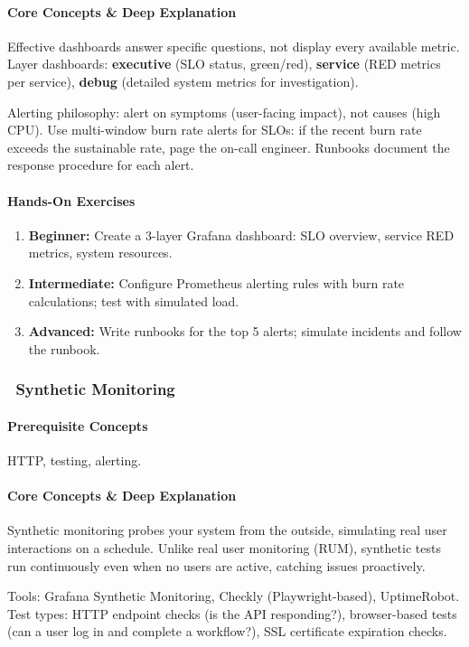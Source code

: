 \documentclass[11pt, a4paper, oneside]{report}
\newcommand{\awareness}[1]{\subsubsection{\texorpdfstring{\fcolorbox{gray!50}{gray!10}{\footnotesize\bfseries\color{gray!50!black} AWARENESS}~#1}{#1}}}
\begin{document}
\paragraph{Core Concepts \& Deep Explanation} Effective dashboards answer specific questions, not display every available metric. Layer dashboards: \textbf{executive} (SLO status, green/red), \textbf{service} (RED metrics per service), \textbf{debug} (detailed system metrics for investigation).

Alerting philosophy: alert on symptoms (user-facing impact), not causes (high CPU). Use multi-window burn rate alerts for SLOs: if the recent burn rate exceeds the sustainable rate, page the on-call engineer. Runbooks document the response procedure for each alert.

\paragraph{Hands-On Exercises}
\begin{enumerate}[leftmargin=*]
\item \textbf{Beginner:} Create a 3-layer Grafana dashboard: SLO overview, service RED metrics, system resources.
\item \textbf{Intermediate:} Configure Prometheus alerting rules with burn rate calculations; test with simulated load.
\item \textbf{Advanced:} Write runbooks for the top 5 alerts; simulate incidents and follow the runbook.
\end{enumerate}

\awareness{Synthetic Monitoring}

\paragraph{Prerequisite Concepts} HTTP, testing, alerting.

\paragraph{Core Concepts \& Deep Explanation} Synthetic monitoring probes your system from the outside, simulating real user interactions on a schedule. Unlike real user monitoring (RUM), synthetic tests run continuously even when no users are active, catching issues proactively.

Tools: Grafana Synthetic Monitoring, Checkly (Playwright-based), UptimeRobot. Test types: HTTP endpoint checks (is the API responding?), browser-based tests (can a user log in and complete a workflow?), SSL certificate expiration checks.
\end{document}

